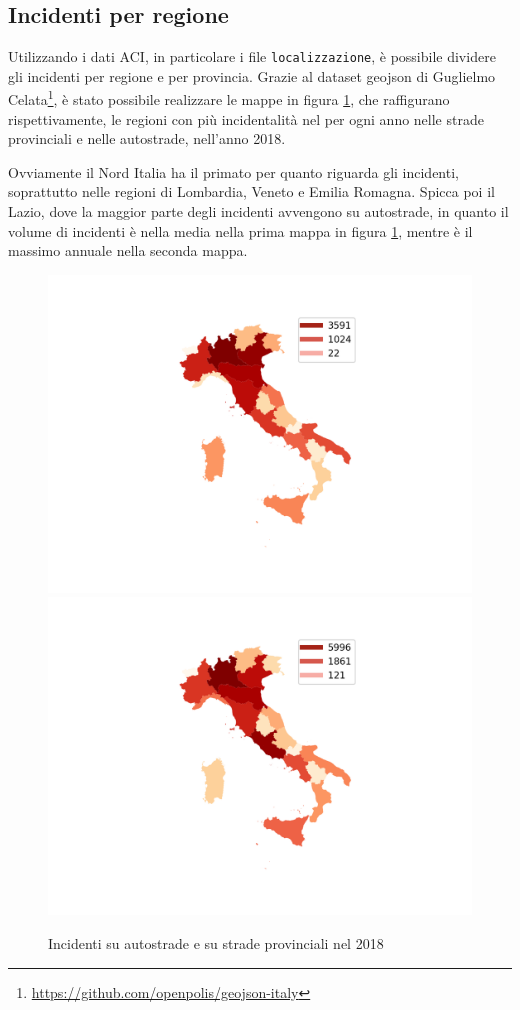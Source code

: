 \documentclass[a4paper,12pt]{report}
\newcommand{\columnstyle}[1]{\texttt{#1}}
\begin{document}
\subsection{Incidenti per regione}

Utilizzando i dati ACI, in particolare i file \columnstyle{localizzazione}, è 
possibile dividere gli incidenti per regione e per provincia.
Grazie al dataset geojson di Guglielmo 
Celata\footnote{\url{https://github.com/openpolis/geojson-italy}}, 
è stato possibile realizzare le mappe in figura \ref{fig:incidenti-per-regione}, 
che raffigurano rispettivamente, le regioni con più incidentalità nel per ogni 
anno nelle strade provinciali e nelle autostrade, nell'anno 2018.

Ovviamente il Nord Italia ha il primato per quanto riguarda gli incidenti, 
soprattutto nelle regioni di Lombardia, Veneto e Emilia Romagna. 
Spicca poi il Lazio, dove la maggior parte degli incidenti avvengono su autostrade, 
in quanto il volume di incidenti è nella media nella prima mappa in figura 
\ref{fig:incidenti-per-regione}, mentre è il massimo annuale nella seconda mappa.

\begin{figure}
    \includegraphics[width=0.5\linewidth]{../src/incidenti/incidenti_aci/mappe_regioni/incidenti_regione.png}
    \includegraphics[width=0.5\linewidth]{../src/incidenti/incidenti_aci/mappe_regioni/incidenti_regione_autostrade.png}
    \caption{Incidenti su autostrade e su strade provinciali nel 2018}
    \label{fig:incidenti-per-regione}
\end{figure}
\end{document}
